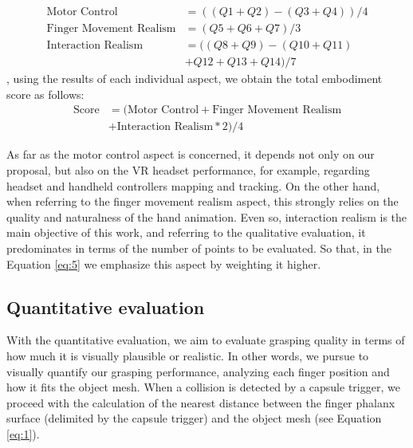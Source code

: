 \begin{equation}\label{eq:6}
\begin{split}
\text{Motor Control} &= ((Q1 + Q2) - (Q3 + Q4)) / 4 \\
\text{Finger Movement Realism} &= (Q5 + Q6 + Q7) / 3 \\
\text{Interaction Realism} &= ((Q8 + Q9) - (Q10 + Q11) \\ 
& + Q12 + Q13 + Q14) / 7  
\end{split}
\end{equation}, using the results of each individual aspect, we obtain the total embodiment score as follows:
\begin{equation} \label{eq:5}
\begin{split}
\text{Score} &= (\text{Motor Control} + \text{Finger Movement Realism} \\
& + \text{Interaction Realism} * 2) / 4
\end{split}
\end{equation}

As far as the motor control aspect is concerned, it depends not only on our proposal, but also on the VR headset performance, for example, regarding headset and handheld controllers mapping and tracking. On the other hand, when referring to the finger movement realism aspect, this strongly relies on the quality and naturalness of the hand animation. Even so, interaction realism is the main objective of this work, and referring to the qualitative evaluation, it predominates in terms of the number of points to be evaluated.  So that, in the Equation \ref{eq:5} we emphasize this aspect by weighting it higher.

\subsection{Quantitative evaluation}
\label{subsec:quantitative}

With the quantitative evaluation, we aim to evaluate grasping quality in terms of how much it is visually plausible or realistic. In other words, we pursue to visually quantify our grasping performance, analyzing each finger position and how it fits the object mesh. When a collision is detected by a capsule trigger, we proceed with the calculation of the nearest distance between the finger phalanx surface (delimited by the capsule trigger) and the object mesh (see Equation \ref{eq:1}).

